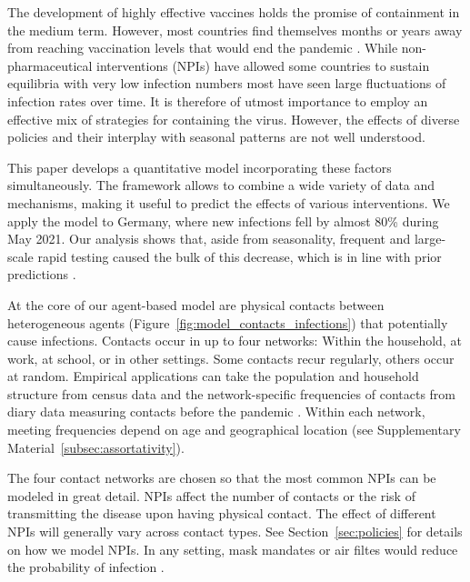 The development of highly effective vaccines holds the promise of
containment in the medium term. However, most countries find themselves months or years
away from reaching vaccination levels that would end the pandemic \citep{Mathieu2021}.
While non-pharmaceutical interventions (NPIs) have allowed some
countries to sustain equilibria with very low infection numbers \citep{Contreras2021}
most have seen large fluctuations of infection rates over time. It is therefore of utmost
importance to employ an effective mix of strategies for containing the virus.
However, the effects of diverse policies and their interplay with seasonal patterns
are not well understood.

This paper develops a quantitative model incorporating these factors simultaneously. The
framework allows to combine a wide variety of data and mechanisms,
making it useful to predict the effects of various interventions. We apply the model to
Germany, where new infections fell by almost 80\% during May 2021. Our analysis
shows that, aside from seasonality, frequent and large-scale rapid testing caused the
bulk of this decrease, which is in line with prior predictions \citep{Mina2021}.

At the core of our agent-based model \citep[][we review more literature in Supplementary
Material~\ref{sec:literature_review}]{Aleta2020,Hinch2020} are physical contacts between
heterogeneous agents (Figure~\ref{fig:model_contacts_infections}) that potentially cause
infections. Contacts occur in up to four networks: Within the household, at
work, at school, or in other settings. Some contacts recur regularly, others occur at random.
Empirical applications can take the population and household structure from census data and the
network-specific frequencies of contacts from diary data measuring contacts before the
pandemic \citep[e.g.][]{Mossong2008,Hoang2019}. Within each network, meeting frequencies
depend on age and geographical location (see Supplementary
Material~\ref{subsec:assortativity}).

The four contact networks are chosen so that the most common NPIs can be modeled in
great detail. NPIs affect the number of contacts or the risk of transmitting the disease
upon having physical contact. The effect of different NPIs will generally vary across
contact types. See Section~\ref{sec:policies} for details on how we model NPIs.
In any setting, mask mandates or air filtes would reduce the probability
of infection \citep{Lessler2021, Cheng2021}.

